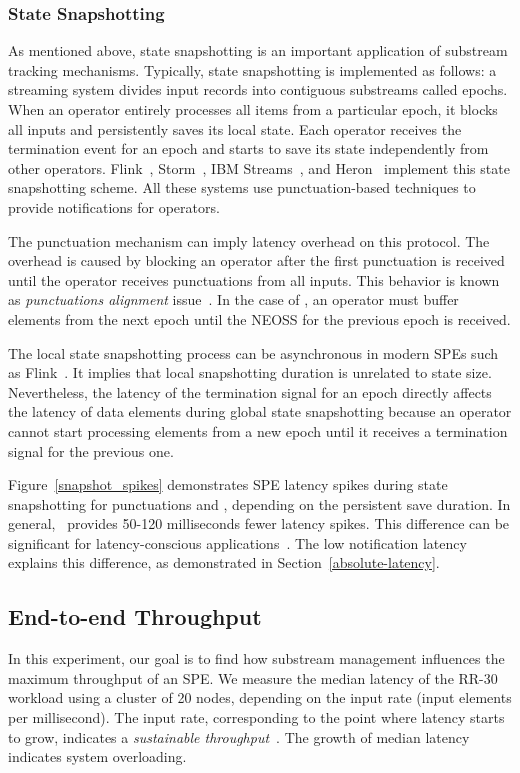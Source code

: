 \subsubsection{State Snapshotting}
As mentioned above, state snapshotting is an important application of substream tracking mechanisms. Typically, state snapshotting is implemented as follows: a streaming system divides input records into contiguous substreams called epochs. When an operator entirely processes all items from a particular epoch, it blocks all inputs and persistently saves its local state. Each operator receives the termination event for an epoch and starts to save its state independently from other operators. Flink~\cite{Carbone:2017:SMA:3137765.3137777}, Storm~\cite{apache:storm:state}, IBM Streams~\cite{jacques2016consistent}, and Heron~\cite{Kulkarni:2015:THS:2723372.2742788} implement this state snapshotting scheme. All these systems use punctuation-based techniques to provide notifications for operators.

The punctuation mechanism can imply latency overhead on this protocol. The overhead is caused by blocking an operator after the first punctuation is received until the operator receives punctuations from all inputs. This behavior is known as {\em punctuations alignment} issue~\cite{Carbone:2017:SMA:3137765.3137777}. In the case of \tracker, an operator must buffer elements from the next epoch until the NEOSS for the previous epoch is received.

The local state snapshotting process can be asynchronous in modern SPEs such as Flink~\cite{Carbone:2017:SMA:3137765.3137777}. It implies that local snapshotting duration is unrelated to state size. Nevertheless, the latency of the termination signal for an epoch directly affects the latency of data elements during global state snapshotting because an operator cannot start processing elements from a new epoch until it receives a termination signal for the previous one.

Figure~\ref{snapshot_spikes} demonstrates SPE latency spikes during state snapshotting for punctuations and \tracker, depending on the persistent save duration. In general, \tracker\ provides 50-120 milliseconds fewer latency spikes. This difference can be significant for latency-conscious applications~\cite{zhang2017sub}. The low notification latency explains this difference, as demonstrated in Section~\ref{absolute-latency}. 

\subsection{End-to-end Throughput}
In this experiment, our goal is to find how substream management influences the maximum throughput of an SPE. We measure the median latency of the RR-30 workload using a cluster of 20 nodes, depending on the input rate (input elements per millisecond). The input rate, corresponding to the point where latency starts to grow, indicates a {\em sustainable throughput}~\cite{karimov2018benchmarking}. The growth of median latency indicates system overloading.

